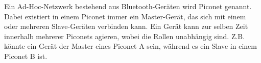Ein Ad-Hoc-Netzwerk bestehend aus Bluetooth-Geräten wird Piconet genannt. Dabei existiert in einem Piconet immer ein Master-Gerät, das sich mit einem oder mehreren Slave-Geräten verbinden kann. Ein Gerät kann zur selben Zeit innerhalb mehrerer Piconets agieren, wobei die Rollen unabhängig sind. Z.B. könnte ein Gerät der Master eines Piconet A sein, während es ein Slave in einem Piconet B ist.

